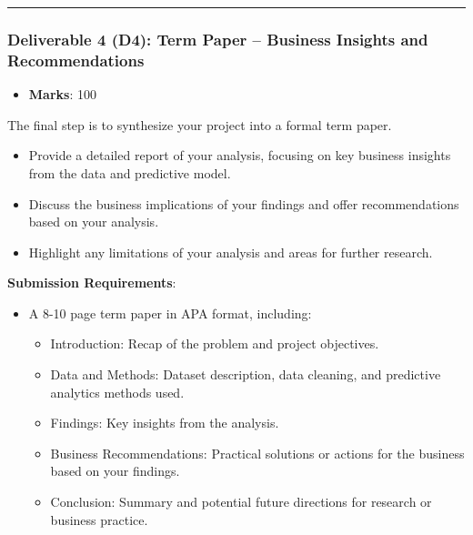\documentclass[
]{article}
\providecommand{\tightlist}{%
  \setlength{\itemsep}{0pt}\setlength{\parskip}{0pt}}
\begin{document}
\begin{center}\rule{0.5\linewidth}{0.5pt}\end{center}

\subsubsection{\texorpdfstring{\textbf{Deliverable 4 (D4): Term Paper --
Business Insights and
Recommendations}}{Deliverable 4 (D4): Term Paper -- Business Insights and Recommendations}}\label{deliverable-4-d4-term-paper-business-insights-and-recommendations}

\begin{itemize}
\tightlist
\item
  \textbf{Marks}: 100
\end{itemize}

The final step is to synthesize your project into a formal term paper.

\begin{itemize}
\tightlist
\item
  Provide a detailed report of your analysis, focusing on key business
  insights from the data and predictive model.
\item
  Discuss the business implications of your findings and offer
  recommendations based on your analysis.
\item
  Highlight any limitations of your analysis and areas for further
  research.
\end{itemize}

\textbf{Submission Requirements}:

\begin{itemize}
\tightlist
\item
  A 8-10 page term paper in APA format, including:

  \begin{itemize}
  \tightlist
  \item
    Introduction: Recap of the problem and project objectives.
  \item
    Data and Methods: Dataset description, data cleaning, and predictive
    analytics methods used.
  \item
    Findings: Key insights from the analysis.
  \item
    Business Recommendations: Practical solutions or actions for the
    business based on your findings.
  \item
    Conclusion: Summary and potential future directions for research or
    business practice.
  \end{itemize}
\end{itemize}
\end{document}
